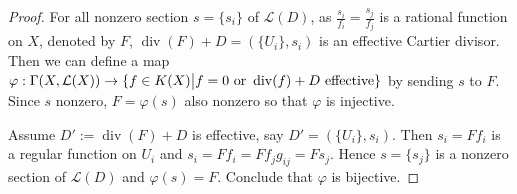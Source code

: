 \documentclass{ctexart}
\newcommand{\divisor}{\operatorname{div}}
\begin{document}
\begin{proof}
    For all nonzero section $s = \{s_{i}\}$ of $\mathcal{L}(D)$, as $\frac{s_{i}}{f_{i}} = \frac{s_{j}}{f_{j}}$ is a rational function on $X$,
    denoted by $F$, $\divisor (F) + D = (\{U_{i}\}, s_{i})$ is an effective Cartier divisor.
    Then we can define a map $\varphi: \Gamma(X, \mathcal{L}(X)) \rightarrow \{f\in K(X) \big{|} f = 0 \text{ or } \divisor (f) + D \text{ effective}\}$ by sending $s$ to $F$.
    Since $s$ nonzero, $F = \varphi(s)$ also nonzero so that $\varphi$ is injective.
    \par
    Assume $D' := \divisor (F) + D$ is effective, say $D' = (\{U_{i}\}, s_{i})$.
    Then $s_{i} = Ff_{i}$ is a regular function on $U_{i}$ and $s_{i} = Ff_{i} = Ff_{j}g_{ij} = Fs_{j}$.
    Hence $s = \{s_{j}\}$ is a nonzero section of $\mathcal{L}(D)$ and $\varphi(s) = F$.
    Conclude that $\varphi$ is bijective.
\end{proof}
\end{document}
